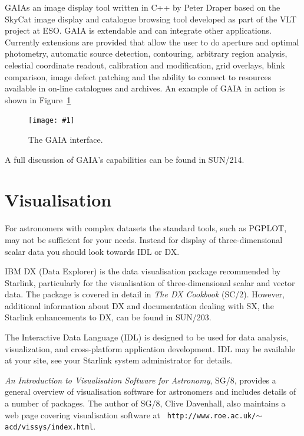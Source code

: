 \documentclass[twoside,11pt]{article}
\newcommand{\htmladdnormallink}[2]{#1}
\newcommand{\htmladdimg}[1]{}
\newcommand{\latex}[1]{#1}
\newcommand{\xref}[3]{#1}
\newcommand{\xlabel}[1]{}
\newcommand{\myfig}[5]{
  \begin{figure}
    \centering\texttt{[image: \#1]}
    \typeout{#1 inserted on page \arabic{page}}
    \caption{\label{#4}#5}
  \end{figure}
  }
\newcommand{\myfig}[5]{
    \label{#4} \htmladdimg{#3}\\
    Figure: #5\\
  }
\begin{document}
\xref{GAIA}{sun214} is an image display tool written in C++ by
\htmladdnormallink{Peter Draper}{mailto:P.W.Draper@durham.ac.uk} based
on the \htmladdnormallink{SkyCat}{http://archive.eso.org/skycat/}
image display and catalogue browsing tool developed as part of the
\htmladdnormallink{VLT}{http://www.eso.org/vlt/} project at
\htmladdnormallink{ESO}{http://www.eso.org/}. GAIA is extendable and
can integrate other applications. Currently extensions are provided
that allow the user to do aperture and optimal photometry, automatic
source detection, contouring, arbitrary region analysis, celestial
coordinate readout, calibration and modification, grid overlays, blink
comparison, image defect patching and the ability to connect to
resources available in on-line catalogues and archives. An example of
GAIA in action is shown in Figure~\ref{sc15_gaia_interface}

\myfig{sc15_gaia.eps}{height=0.7\textheight}{sc15_gaia.gif}{sc15_gaia_interface}{The
GAIA interface.}

A full discussion of GAIA's capabilities can be found in \xref{SUN/214}{sun214}{}.

\section{\xlabel{sc15_visualisation}Visualisation\label{sc15_visualisation}}

For astronomers with complex datasets the standard tools, such as
PGPLOT, may not be sufficient for your needs. Instead for display of
three-dimensional scalar data you should look towards IDL or DX.

IBM DX (Data Explorer) is the data visualisation package recommended
by Starlink, particularly for the visualisation of three-dimensional
scalar and vector data. The package is covered in detail in \xref{{\em
The DX Cookbook} (SC/2)}{sc2}{}. However, additional information about
DX and documentation dealing with SX, the Starlink enhancements to DX,
can be found in \xref{SUN/203}{sun203}{}.

The \htmladdnormallink{Interactive Data
Language}{http://www.rsinc.com/idl/index.cfm} (IDL) is designed to be
used for data analysis, visualization, and cross-platform application
development. IDL may be available at your site, see your Starlink
system administrator for details.

\xref{{\em An Introduction to Visualisation Software for
Astronomy}}{sg8}{}, SG/8, provides a general overview of visualisation
software for astronomers and includes details of a number of packages.
The author of SG/8, \htmladdnormallink{Clive
Davenhall}{mailto:acd@roe.ac.uk}, also maintains a
\htmladdnormallink{web
page}{http://www.roe.ac.uk/~acd/vissys/index.html} covering
visualisation software\latex{ at {\tt
http://www.roe.ac.uk/$\sim$acd/vissys/index.html}}.
\end{document}
